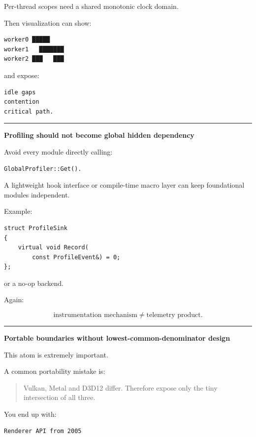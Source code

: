 Per-thread scopes need a shared monotonic clock domain.

Then visualization can show:

\begin{verbatim}
worker0 █████
worker1   ███████
worker2 ███   ███
\end{verbatim}

and expose:

\begin{verbatim}
idle gaps
contention
critical path.
\end{verbatim}

\begin{center}\rule{0.5\linewidth}{0.5pt}\end{center}

\textbf{Profiling should not become global hidden dependency}

Avoid every module directly calling:

\begin{verbatim}
GlobalProfiler::Get().
\end{verbatim}

A lightweight hook interface or compile-time macro layer can keep foundational modules independent.

Example:

\begin{verbatim}
struct ProfileSink
{
    virtual void Record(
        const ProfileEvent&) = 0;
};
\end{verbatim}

or a no-op backend.

Again:

\[
\text{instrumentation mechanism}
\neq
\text{telemetry product}.
\]

\begin{center}\rule{0.5\linewidth}{0.5pt}\end{center}

\textbf{Portable boundaries without lowest-common-denominator design}

This atom is extremely important.

A common portability mistake is:

\begin{quote}
Vulkan, Metal and D3D12 differ. Therefore expose only the tiny intersection of all three.
\end{quote}

You end up with:

\begin{verbatim}
Renderer API from 2005
\end{verbatim}

